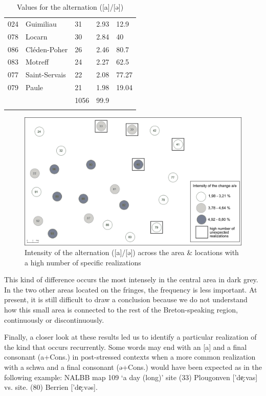 \documentclass[output=paper]{LSP/langsci}
\begin{document}
\begin{table}
{\begin{tabular}{lllll}
 024 & Guimiliau & 31 & 2.93 & 12.9\\
 078 & Locarn & 30 & 2.84 & 40\\
 086 & Cléden-Poher & 26 & 2.46 & 80.7\\
 083 & Motreff & 24 & 2.27 & 62.5\\
 077 & Saint-Servais & 22 & 2.08 & 77.27\\
 079 & Paule & 21 & 1.98 & 19.04\\
\midrule
&  & 1056 & 99.9 & \\
\lspbottomrule
\end{tabular}
}
\caption{Values for the alternation ([a]/[ə])}
\label{tab:6}
\end{table}

\begin{figure}
\includegraphics[width=\textwidth]{illustrations/brun_etal_fig6}
\caption{Intensity of the alternation ([a]/[ə]) across the area \& locations with a high number of specific realizations}
\label{fig:6}
\end{figure}

This kind of difference occurs the most intensely in the central area in dark grey. In the two other areas located on the fringes, the frequency is less important. At present, it is still difficult to draw a conclusion because we do not understand how this small area is connected to the rest of the Breton-speaking region, continuously or discontinuously.

Finally, a closer look at these results led us to identify a particular realization of the kind that occurs recurrently. Some words may end with an [a] and a final consonant (a+Cons.) in post-stressed contexts when a more common realization with a schwa and a final consonant (ə+Cons.) would have been expected as in the following example: NALBB map 109 ‘a day (long)’ site (33) Plougonven ['de̝:vas] vs. site. (80) Berrien ['de̝:vəs].
\end{document}
